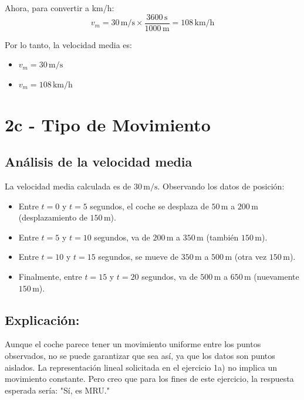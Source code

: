 \documentclass{article}
\begin{document}
Ahora, para convertir a km/h:
\[
v_m = 30 \, \text{m/s} \times \frac{3600 \, \text{s}}{1000 \, \text{m}} = \boxed{108 \, \text{km/h}}
\]

Por lo tanto, la velocidad media es:

\begin{itemize}
    \item \(v_m = 30 \, \text{m/s}\)
    \item \(v_m = 108 \, \text{km/h}\)
\end{itemize}


\section*{2c - Tipo de Movimiento}

\subsection*{Análisis de la velocidad media}

La velocidad media calculada es de \(30 \, \text{m/s}\). Observando los datos de posición:

\begin{itemize}
    \item Entre \(t = 0\) y \(t = 5\) segundos, el coche se desplaza de \(50 \, \text{m}\) a \(200 \, \text{m}\) (desplazamiento de \(150 \, \text{m}\)).
    \item Entre \(t = 5\) y \(t = 10\) segundos, va de \(200 \, \text{m}\) a \(350 \, \text{m}\) (también \(150 \, \text{m}\)).
    \item Entre \(t = 10\) y \(t = 15\) segundos, se mueve de \(350 \, \text{m}\) a \(500 \, \text{m}\) (otra vez \(150 \, \text{m}\)).
    \item Finalmente, entre \(t = 15\) y \(t = 20\) segundos, va de \(500 \, \text{m}\) a \(650 \, \text{m}\) (nuevamente \(150 \, \text{m}\)).
\end{itemize}

\subsection*{Explicación:}

Aunque el coche parece tener un movimiento uniforme entre los puntos observados, no se puede garantizar que sea así, ya que los datos son puntos aislados. La representación lineal solicitada en el ejercicio 1a) no implica un movimiento constante.
Pero creo que para los fines de este ejercicio, la respuesta esperada sería: "Sí, es MRU."
\end{document}
